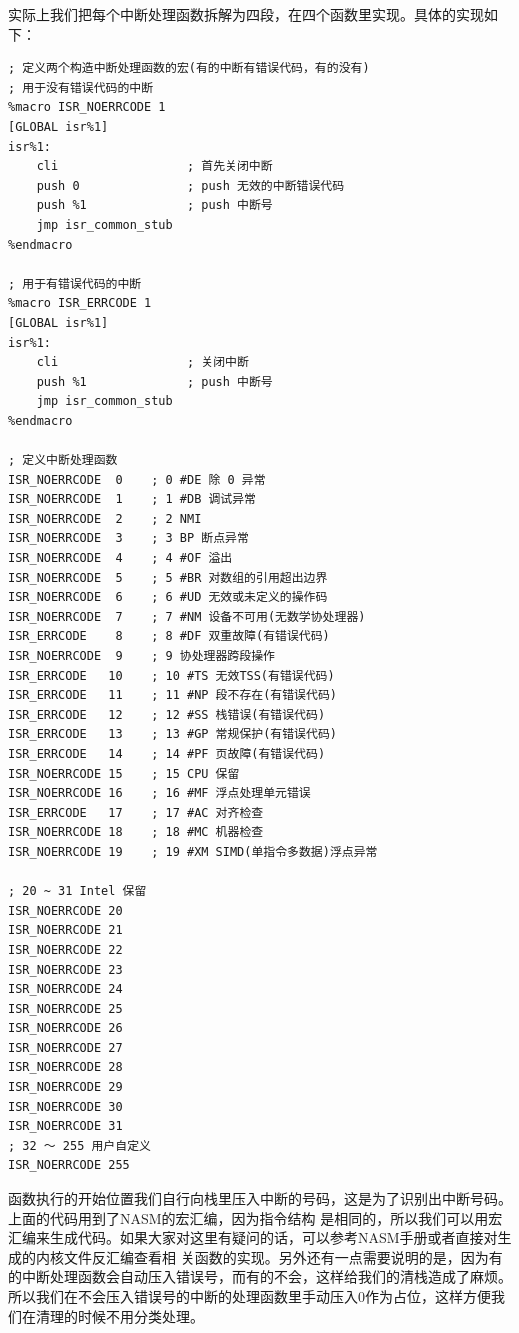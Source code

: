 \par 实际上我们把每个中断处理函数拆解为四段，在四个函数里实现。具体的实现如下：

\begin{lstlisting}[language = {[x86masm]Assembler}, caption = idt/idt\_s.s]
; 定义两个构造中断处理函数的宏(有的中断有错误代码，有的没有)
; 用于没有错误代码的中断
%macro ISR_NOERRCODE 1
[GLOBAL isr%1]
isr%1:
	cli                  ; 首先关闭中断
	push 0               ; push 无效的中断错误代码
	push %1              ; push 中断号
	jmp isr_common_stub
%endmacro

; 用于有错误代码的中断
%macro ISR_ERRCODE 1
[GLOBAL isr%1]
isr%1:
	cli                  ; 关闭中断
	push %1              ; push 中断号
	jmp isr_common_stub
%endmacro

; 定义中断处理函数
ISR_NOERRCODE  0 	; 0 #DE 除 0 异常
ISR_NOERRCODE  1 	; 1 #DB 调试异常
ISR_NOERRCODE  2 	; 2 NMI
ISR_NOERRCODE  3 	; 3 BP 断点异常 
ISR_NOERRCODE  4 	; 4 #OF 溢出 
ISR_NOERRCODE  5 	; 5 #BR 对数组的引用超出边界 
ISR_NOERRCODE  6 	; 6 #UD 无效或未定义的操作码 
ISR_NOERRCODE  7 	; 7 #NM 设备不可用(无数学协处理器) 
ISR_ERRCODE    8 	; 8 #DF 双重故障(有错误代码) 
ISR_NOERRCODE  9 	; 9 协处理器跨段操作
ISR_ERRCODE   10 	; 10 #TS 无效TSS(有错误代码) 
ISR_ERRCODE   11 	; 11 #NP 段不存在(有错误代码) 
ISR_ERRCODE   12 	; 12 #SS 栈错误(有错误代码) 
ISR_ERRCODE   13 	; 13 #GP 常规保护(有错误代码) 
ISR_ERRCODE   14 	; 14 #PF 页故障(有错误代码) 
ISR_NOERRCODE 15 	; 15 CPU 保留 
ISR_NOERRCODE 16 	; 16 #MF 浮点处理单元错误 
ISR_ERRCODE   17 	; 17 #AC 对齐检查 
ISR_NOERRCODE 18 	; 18 #MC 机器检查 
ISR_NOERRCODE 19 	; 19 #XM SIMD(单指令多数据)浮点异常

; 20 ~ 31 Intel 保留
ISR_NOERRCODE 20
ISR_NOERRCODE 21
ISR_NOERRCODE 22
ISR_NOERRCODE 23
ISR_NOERRCODE 24
ISR_NOERRCODE 25
ISR_NOERRCODE 26
ISR_NOERRCODE 27
ISR_NOERRCODE 28
ISR_NOERRCODE 29
ISR_NOERRCODE 30
ISR_NOERRCODE 31
; 32 ～ 255 用户自定义
ISR_NOERRCODE 255
\end{lstlisting}

\par 函数执行的开始位置我们自行向栈里压入中断的号码，这是为了识别出中断号码。上面的代码用到了NASM的宏汇编，因为指令结构\allowbreak
是相同的，所以我们可以用宏汇编来生成代码。如果大家对这里有疑问的话，可以参考NASM手册或者直接对生成的内核文件反汇编查看相\allowbreak
关函数的实现。另外还有一点需要说明的是，因为有的中断处理函数会自动压入错误号，而有的不会，这样给我们的清栈造成了麻烦。\allowbreak
所以我们在不会压入错误号的中断的处理函数里手动压入0作为占位，这样方便我们在清理的时候不用分类处理。

